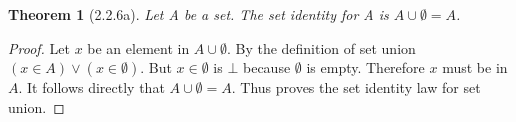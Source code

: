 \documentclass[a4paper, 12pt]{article}
\theoremstyle{plain}
\newtheorem*{theorem*}{Theorem}
\begin{document}
	
	\begin{theorem*}[2.2.6a]
		Let A be a set. The set identity for A is $A \cup \emptyset = A$.
	\end{theorem*}
	
	\begin{proof}
		Let $x$ be an element in $A \cup \emptyset$. By the definition of set union \newline 
		$(x \in A) \lor (x \in \emptyset)$. But $x \in \emptyset$ is $\bot$ because $\emptyset$ is 
		empty. Therefore $x$ must be in $A$. It follows directly that $A \cup \emptyset = A$. Thus 
		proves the set identity law for set union.
	\end{proof}
\end{document}
